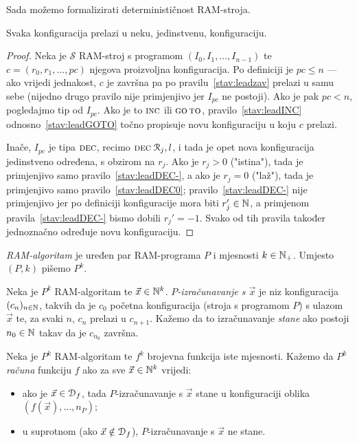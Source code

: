 Sada možemo formalizirati determinističnost RAM-stroja.

\begin{lema}[{name=[determinističnost RAM-stroja]}]\label{lema:ramdet}
Svaka konfiguracija prelazi u neku, jedinstvenu, konfiguraciju.
\end{lema}
\begin{proof}
    Neka je $\mathcal S$ RAM-stroj s programom $(I_0, I_1,\dotsc, I_{n-1})$ te $c=(r_0,r_1,\dotsc,pc)$ njegova proizvoljna konfiguracija. Po definiciji je $pc\le n$ --- ako vrijedi jednakost, $c$ je završna pa po pravilu~\ref{stav:leadzav} prelazi u samu sebe (nijedno drugo pravilo nije primjenjivo jer $I_{pc}$ ne postoji). Ako je pak $pc<n$, pogledajmo tip od $I_{pc}$. Ako je to $\textsc{inc}$ ili $\textsc{go\,to}$, pravilo~\ref{stav:leadINC} odnosno~\ref{stav:leadGOTO} točno propisuje novu konfiguraciju u koju $c$ prelazi.

    Inače, $I_{pc}$ je tipa $\textsc{dec}$, recimo $\textsc{dec}\;\mathcal R_{j},l$, i tada je opet nova konfiguracija jedinstveno određena, s obzirom na $r_j$. Ako je $r_j>0$ ("istina"), tada je primjenjivo samo pravilo~\ref{stav:leadDEC-}, a ako je $r_j=0$ ("laž"), tada je primjenjivo samo pravilo~\ref{stav:leadDEC0}; pravilo~\ref{stav:leadDEC-} nije primjenjivo jer po definiciji konfiguracije mora biti $r_j'\in{\mathbb N}$, a primjenom pravila~\ref{stav:leadDEC-} bismo dobili $r_j'=-1$. Svako od tih pravila također jednoznačno određuje novu konfiguraciju.
\end{proof}

\begin{definicija}[{name=[{RAM-algoritam, izračunavanje i računanje funkcije}]}]
\label{def:compute}
\emph{RAM-algoritam} je uređen par RAM-programa $P$ i mjesnosti $k\in{\mathbb N}_+$. Umjesto $(P,k)$ pišemo $P^k$.

Neka je $P^k$ RAM-algoritam te $\vec x\in{\mathbb N}^k$. \emph{$P$\!-izračunavanje s $\vec x$} je niz konfiguracija $(c_n)_{n\in{\mathbb N}}$, takvih da je $c_0$ početna konfiguracija (stroja s programom $P$) s ulazom $\vec x$ te, za svaki $n$, $c_n$ prelazi u $c_{n+1}$. Kažemo da to izračunavanje \emph{stane} ako postoji $n_0\in{\mathbb N}$ takav da je $c_{n_0}$ završna.

Neka je $P^k$ RAM-algoritam te $f^k$ brojevna funkcija iste mjesnosti. Kažemo da $P^k$
\emph{računa} funkciju $f$ ako za sve $\vec x\in{\mathbb N}^k$ vrijedi:
\begin{itemize}
    \item ako  je $\vec x\in \mathcal D_{f}$, tada $P$-izračunavanje s $\vec x$ stane u konfiguraciji oblika $(f(\vec x),\dotsc,n_P)$;
    \item u suprotnom (ako $\vec x\notin\mathcal D_{f}$), $P$-izračunavanje s $\vec x$ ne stane.\qedhere
\end{itemize}
\end{definicija}

